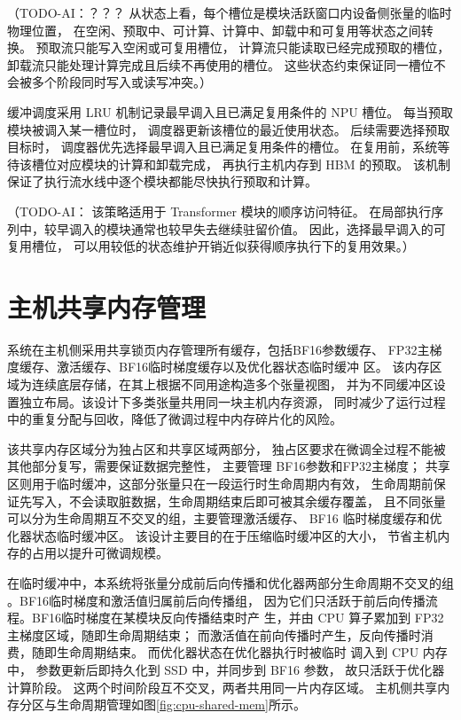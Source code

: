 \documentclass[bachelor,openany,oneside,color,AutoFakeBold=true]{buaathesis}
\begin{document}
（TODO-AI：？？？
从状态上看，每个槽位是模块活跃窗口内设备侧张量的临时物理位置，
在空闲、预取中、可计算、计算中、卸载中和可复用等状态之间转换。
预取流只能写入空闲或可复用槽位，
计算流只能读取已经完成预取的槽位，
卸载流只能处理计算完成且后续不再使用的槽位。
这些状态约束保证同一槽位不会被多个阶段同时写入或读写冲突。）

缓冲调度采用 LRU 机制记录最早调入且已满足复用条件的 NPU 槽位。
每当预取模块被调入某一槽位时，
调度器更新该槽位的最近使用状态。
后续需要选择预取目标时，
调度器优先选择最早调入且已满足复用条件的槽位。
在复用前，系统等待该槽位对应模块的计算和卸载完成，
再执行主机内存到 HBM 的预取。
该机制保证了执行流水线中逐个模块都能尽快执行预取和计算。

（TODO-AI：
该策略适用于 Transformer 模块的顺序访问特征。
在局部执行序列中，较早调入的模块通常也较早失去继续驻留价值。
因此，选择最早调入的可复用槽位，
可以用较低的状态维护开销近似获得顺序执行下的复用效果。）



\section{主机共享内存管理}
系统在主机侧采用共享锁页内存管理所有缓存，包括BF16参数缓存、
FP32主梯度缓存、激活缓存、BF16临时梯度缓存以及优化器状态临时缓冲
区。
该内存区域为连续底层存储，在其上根据不同用途构造多个张量视图，
并为不同缓冲区设置独立布局。该设计下多类张量共用同一块主机内存资源，
同时减少了运行过程中的重复分配与回收，降低了微调过程中内存碎片化的风险。

该共享内存区域分为独占区和共享区域两部分，
独占区要求在微调全过程不能被其他部分复写，需要保证数据完整性，
主要管理 BF16参数和FP32主梯度；
共享区则用于临时缓冲，这部分张量只在一段运行时生命周期内有效，
生命周期前保证先写入，不会读取脏数据，生命周期结束后即可被其余缓存覆盖，
且不同张量可以分为生命周期互不交叉的组，主要管理激活缓存、
BF16 临时梯度缓存和优化器状态临时缓冲区。
该设计主要目的在于压缩临时缓冲区的大小，
节省主机内存的占用以提升可微调规模。

在临时缓冲中，本系统将张量分成前后向传播和优化器两部分生命周期不交叉的组
。BF16临时梯度和激活值归属前后向传播组，
因为它们只活跃于前后向传播流程。BF16临时梯度在某模块反向传播结束时产
生，并由 CPU 算子累加到 FP32 主梯度区域，随即生命周期结束；
而激活值在前向传播时产生，反向传播时消费，随即生命周期结束。
而优化器状态在优化器执行时被临时
调入到 CPU 内存中，
参数更新后即持久化到 SSD 中，并同步到 BF16 参数，
故只活跃于优化器计算阶段。
这两个时间阶段互不交叉，两者共用同一片内存区域。
主机侧共享内存分区与生命周期管理如图\ref{fig:cpu-shared-mem}所示。
\end{document}
